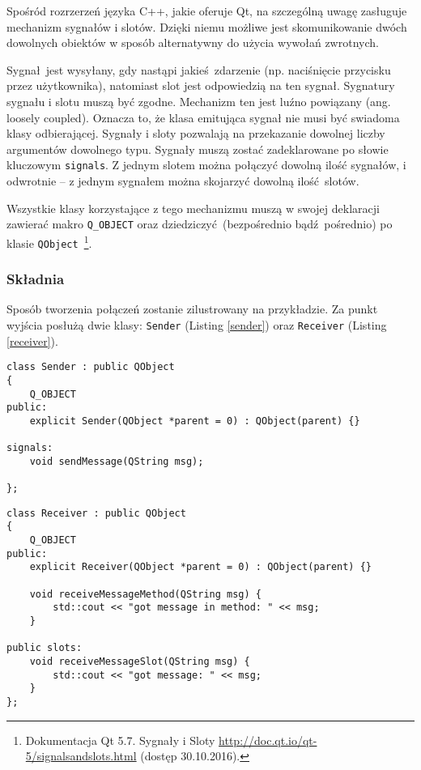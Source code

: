 Spośród rozrzerzeń języka C++, jakie oferuje Qt, na szczególną uwagę zasługuje mechanizm sygnałów i slotów. Dzięki niemu możliwe jest skomunikowanie dwóch dowolnych obiektów w sposób alternatywny do użycia wywołań zwrotnych. 

Sygnał jest wysyłany, gdy nastąpi jakieś zdarzenie (np. naciśnięcie przycisku przez użytkownika), natomiast slot jest odpowiedzią na ten sygnał. Sygnatury sygnału i slotu muszą być zgodne. Mechanizm ten jest luźno powiązany (ang. loosely coupled). Oznacza to, że klasa emitująca sygnał nie musi być swiadoma klasy odbierającej. Sygnały i sloty pozwalają na przekazanie dowolnej liczby argumentów dowolnego typu. Sygnały muszą zostać zadeklarowane po słowie kluczowym \lstinline$signals$. Z jednym slotem można połączyć dowolną ilość sygnałów, i odwrotnie -- z jednym sygnałem można skojarzyć dowolną ilość slotów.

Wszystkie klasy korzystające z tego mechanizmu muszą w swojej deklaracji zawierać makro \lstinline$Q_OBJECT$ oraz dziedziczyć (bezpośrednio bądź pośrednio) po klasie \lstinline$QObject$~\footnote{Dokumentacja Qt 5.7. Sygnały i Sloty \url{http://doc.qt.io/qt-5/signalsandslots.html} (dostęp 30.10.2016).}.


\subsubsection{Składnia} 
Sposób tworzenia połączeń zostanie zilustrowany na przykładzie. Za punkt wyjścia posłużą dwie klasy: \lstinline$Sender$ (Listing \ref{sender}) oraz \lstinline$Receiver$ (Listing \ref{receiver}).

\begin{minipage}{\textwidth}
	\begin{lstlisting}[label=sender,caption=Klasa Sender]
class Sender : public QObject
{
	Q_OBJECT
public:
	explicit Sender(QObject *parent = 0) : QObject(parent) {}
	
signals:
	void sendMessage(QString msg);
	
};
	\end{lstlisting}
\end{minipage}

\begin{minipage}{\textwidth}
	\begin{lstlisting}[label=receiver, caption=Klasa Receiver]
class Receiver : public QObject
{
	Q_OBJECT
public:
	explicit Receiver(QObject *parent = 0) : QObject(parent) {}
	
	void receiveMessageMethod(QString msg) {
		std::cout << "got message in method: " << msg;
	}
	
public slots:
	void receiveMessageSlot(QString msg) {
		std::cout << "got message: " << msg;
	}
};
	\end{lstlisting}
\end{minipage}

